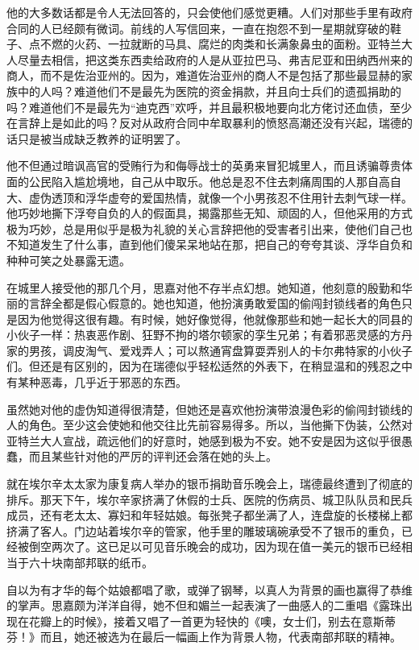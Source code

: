 \par 他的大多数话都是令人无法回答的，只会使他们感觉更糟。人们对那些手里有政府合同的人已经颇有微词。前线的人写信回来，一直在抱怨不到一星期就穿破的鞋子、点不燃的火药、一拉就断的马具、腐烂的肉类和长满象鼻虫的面粉。亚特兰大人尽量去相信，把这类东西卖给政府的人是从亚拉巴马、弗吉尼亚和田纳西州来的商人，而不是佐治亚州的。因为，难道佐治亚州的商人不是包括了那些最显赫的家族中的人吗？难道他们不是最先为医院的资金捐款，并且向士兵们的遗孤捐助的吗？难道他们不是最先为“迪克西”欢呼，并且最积极地要向北方佬讨还血债，至少在言辞上是如此的吗？反对从政府合同中牟取暴利的愤怒高潮还没有兴起，瑞德的话只是被当成缺乏教养的证明罢了。
\par 他不但通过暗讽高官的受贿行为和侮辱战士的英勇来冒犯城里人，而且诱骗尊贵体面的公民陷入尴尬境地，自己从中取乐。他总是忍不住去刺痛周围的人那自高自大、虚伪透顶和浮华虚夸的爱国热情，就像一个小男孩忍不住用针去刺气球一样。他巧妙地撕下浮夸自负的人的假面具，揭露那些无知、顽固的人，但他采用的方式极为巧妙，总是用似乎是极为礼貌的关心言辞把他的受害者引出来，使他们自己也不知道发生了什么事，直到他们傻呆呆地站在那，把自己的夸夸其谈、浮华自负和种种可笑之处暴露无遗。
\par 在城里人接受他的那几个月，思嘉对他不存半点幻想。她知道，他刻意的殷勤和华丽的言辞全都是假心假意的。她也知道，他扮演勇敢爱国的偷闯封锁线者的角色只是因为他觉得这很有趣。有时候，她好像觉得，他就像那些和她一起长大的同县的小伙子一样：热衷恶作剧、狂野不拘的塔尔顿家的孪生兄弟；有着邪恶灵感的方丹家的男孩，调皮淘气、爱戏弄人；可以熬通宵盘算耍弄别人的卡尔弗特家的小伙子们。但还是有区别的，因为在瑞德似乎轻松适然的外表下，在稍显温和的残忍之中有某种恶毒，几乎近于邪恶的东西。
\par 虽然她对他的虚伪知道得很清楚，但她还是喜欢他扮演带浪漫色彩的偷闯封锁线的人的角色。至少这会使她和他交往比先前容易得多。所以，当他撕下伪装，公然对亚特兰大人宣战，疏远他们的好意时，她感到极为不安。她不安是因为这似乎很愚蠢，而且某些针对他的严厉的评判还会落在她的头上。
\par 就在埃尔辛太太家为康复病人举办的银币捐助音乐晚会上，瑞德最终遭到了彻底的排斥。那天下午，埃尔辛家挤满了休假的士兵、医院的伤病员、城卫队队员和民兵成员，还有老太太、寡妇和年轻姑娘。每张凳子都坐满了人，连盘旋的长楼梯上都挤满了客人。门边站着埃尔辛的管家，他手里的雕玻璃碗承受不了银币的重负，已经被倒空两次了。这已足以可见音乐晚会的成功，因为现在值一美元的银币已经相当于六十块南部邦联的纸币。
\par 自以为有才华的每个姑娘都唱了歌，或弹了钢琴，以真人为背景的画也赢得了恭维的掌声。思嘉颇为洋洋自得，她不但和媚兰一起表演了一曲感人的二重唱《露珠出现在花瓣上的时候》，接着又唱了一首更为轻快的《噢，女士们，别去在意斯蒂芬！》而且，她还被选为在最后一幅画上作为背景人物，代表南部邦联的精神。
